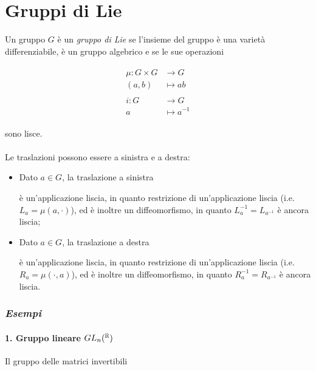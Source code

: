 \section{Gruppi di Lie}

Un gruppo $ G $ è un \textit{gruppo di Lie} se l'insieme del gruppo è una varietà differenziabile, è un gruppo algebrico e se le sue operazioni

\begin{align}
	\begin{split}
		\mu : G \times G &\to G\\
		(a,b) &\mapsto a b\\\\
		i : G &\to G\\
		a &\mapsto a^{-1}
	\end{split}
\end{align}

sono lisce.\\\\
%
Le traslazioni possono essere a sinistra e a destra:

\begin{itemize}
	\item Dato $ a \in G $, la traslazione a sinistra
	
	
	è un'applicazione liscia, in quanto restrizione di un'applicazione liscia (i.e. $ L_{a} = \mu(a,\cdot) $), ed è inoltre un diffeomorfismo, in quanto $ L_{a}^{-1} = L_{a^{-1}} $ è ancora liscia;
	
	\item Dato $ a \in G $, la traslazione a destra
	
	
	è un'applicazione liscia, in quanto restrizione di un'applicazione liscia (i.e. $ R_{a} = \mu(\cdot,a) $), ed è inoltre un diffeomorfismo, in quanto $ R_{a}^{-1} = R_{a^{-1}} $ è ancora liscia.
\end{itemize}

\subsubsection{\textit{Esempi}}

\paragraph{1. Gruppo lineare $ GL_{n}(^{\mathbb{R}}) $}

Il gruppo delle matrici invertibili

